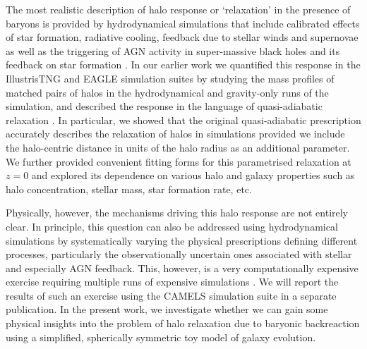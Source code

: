 The most realistic description of halo response or `relaxation' in the presence of baryons is provided by hydrodynamical simulations that include calibrated effects of star formation, radiative cooling, feedback due to stellar winds and supernovae as well as the triggering of AGN activity in super-massive black holes and its feedback on star formation \cite{2015Schaye_EAGLE,2018TNG_Pillepich_etal}. 
In our earlier work \cite{2023Velmani&Paranjape} we quantified this response in the IllustrisTNG \cite{2018TNG_Pillepich_etal}
and EAGLE \cite{2015Schaye_EAGLE} %
simulation suites by studying the mass profiles of matched pairs of halos in the hydrodynamical and gravity-only runs of the simulation, and described the response in the language of quasi-adiabatic relaxation \cite{2011TeyssierMMDM}. %
In particular, we showed that the original quasi-adiabatic prescription accurately describes the relaxation of halos in simulations provided we include the halo-centric distance in units of the halo radius as an additional parameter. We further provided convenient fitting forms for this parametrised relaxation at $z=0$ and explored its dependence on various halo and galaxy properties such as halo concentration, stellar mass, star formation rate, etc.

Physically, however, the mechanisms driving this halo response are not entirely clear. In principle, this question can also be addressed using hydrodynamical simulations by systematically varying the physical prescriptions defining different processes, particularly the observationally uncertain ones associated with stellar and especially AGN feedback. This, however, is a very computationally expensive exercise requiring multiple runs of expensive simulations \cite{2015Schaye_EAGLE,2021camels_presentation}.
We will report the results of such an exercise using the CAMELS simulation suite \cite{2022camels_data_release1} in a separate publication. In the present work, we investigate whether we can gain some physical insights into the problem of halo relaxation due to baryonic backreaction using a simplified, spherically symmetric toy model of galaxy evolution.

